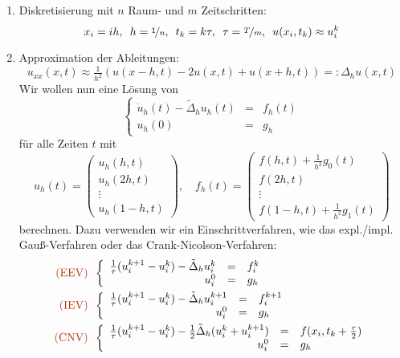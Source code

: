 \documentclass{cheat-sheet}
\newcommand{\Laplace}{\Delta}
\newcommand{\probl}[1]{\textcolor{ProblemColor}{#1}}
\begin{document}
\begin{verf}
  \begin{enumerate}
    \item Diskretisierung mit $n$ Raum- und $m$ Zeitschritten:
    \[
      x_i = ih, \enspace
      h = \nicefrac{1}{n}, \enspace
      t_k = k \tau, \enspace
      \tau = \nicefrac{T}{m}, \enspace
      u(x_i, t_k) \approx u_i^k
    \]
    \item Approximation der Ableitungen:
    \[ u_{xx}(x,t) \approx \tfrac{1}{h^2} \left( u(x-h, t) - 2u(x,t) + u(x+h, t) \right) =: \Laplace_h u(x,t) \]
    Wir wollen nun eine Lösung von
    \[ \left\{ \begin{array}{rll}
      \dot{u}_h(t) - \tilde{\Laplace}_h u_h(t) &=& f_h(t) \\
      u_h(0) &=& g_h
    \end{array} \right. \]
    für alle Zeiten $t$ mit
    \[
      u_h(t) = \begin{pmatrix}
        u_h(h, t) \\
        u_h(2h, t) \\
        \vdots \\
        u_h(1-h,t)
      \end{pmatrix}, \quad
      f_h(t) = \begin{pmatrix}
        f(h, t) + \tfrac{1}{h^2} g_0(t) \\
        f(2h, t) \\
        \vdots \\
        f(1-h,t) + \tfrac{1}{h^2} g_1(t)
      \end{pmatrix}
    \]
    berechnen.
    Dazu verwenden wir ein Einschrittverfahren, wie das expl./impl. Gauß-Verfahren oder das Crank-Nicolson-Verfahren:
    \begin{align*}
      \text{\probl{(EEV)}} \enspace
      & \left\{ \begin{array}{rcl}
        \tfrac{1}{\tau} (u_i^{k+1} - u_i^k) - \tilde{\Laplace}_h u_i^k &=& f_i^k \\
        u_i^0 &=& g_h
      \end{array} \right. \\
      \text{\probl{(IEV)}} \enspace
      & \left\{ \begin{array}{rcl}
        \tfrac{1}{\tau} (u_i^{k+1} - u_i^k) - \tilde{\Laplace}_h u_i^{k+1} &=& f_i^{k+1} \\
        u_i^0 &=& g_h
      \end{array} \right. \\
      \text{\probl{(CNV)}} \enspace
      & \left\{ \begin{array}{rcl}
        \tfrac{1}{\tau} (u_i^{k+1} - u_i^k) - \tfrac{1}{2} \tilde{\Laplace}_h (u_i^k + u_i^{k+1}) &=& f(x_i, t_k + \tfrac{\tau}{2}) \\
        u_i^0 &=& g_h
      \end{array} \right.
    \end{align*}
  \end{enumerate}
\end{verf}
\end{document}
